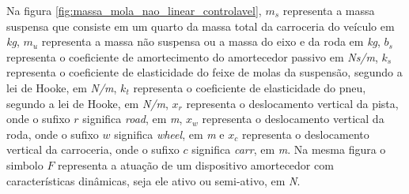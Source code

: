 \documentclass[a4paper]{ifacconf}
\begin{document}
    \FloatBarrier
    Na figura \ref{fig:massa_mola_nao_linear_controlavel}, $m_s$ representa a massa suspensa que consiste em um quarto da massa total da carroceria do veículo em \emph{kg}, $m_u$ representa a massa não suspensa ou a massa do eixo e da roda em \emph{kg}, $b_s$ representa o coeficiente de amortecimento do amortecedor passivo em \emph{Ns/m}, $k_s$ representa o coeficiente de elasticidade do feixe de molas da suspensão, segundo a lei de Hooke, em \emph{N/m}, $k_t$ representa o coeficiente de elasticidade do pneu, segundo a lei de Hooke, em \emph{N/m}, $x_r$ representa o deslocamento vertical da pista, onde o sufixo $r$ significa \emph{road}, em \emph{m}, $x_w$ representa o deslocamento vertical da roda, onde o sufixo $w$ significa \emph{wheel}, em \emph{m} e $x_c$ representa o deslocamento vertical da carroceria, onde o sufixo $c$ significa \emph{carr}, em \emph{m}. Na mesma figura o simbolo $F$ representa a atuação de um dispositivo amortecedor com características dinâmicas, seja ele ativo ou semi-ativo, em \emph{N}.
    
\end{document}

